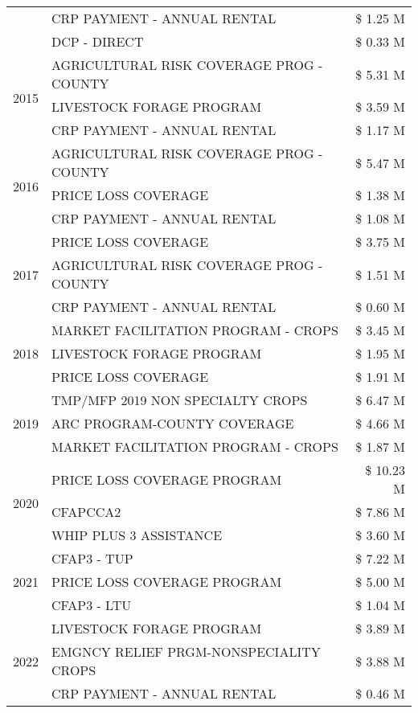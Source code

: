 \begin{tabular}{llr}
 & CRP PAYMENT - ANNUAL RENTAL & \$ 1.25 M \\
 & DCP - DIRECT & \$ 0.33 M \\
\cline{1-3}
\multirow[t]{3}{*}{2015} & AGRICULTURAL RISK COVERAGE PROG - COUNTY & \$ 5.31 M \\
 & LIVESTOCK FORAGE PROGRAM & \$ 3.59 M \\
 & CRP PAYMENT - ANNUAL RENTAL & \$ 1.17 M \\
\cline{1-3}
\multirow[t]{3}{*}{2016} & AGRICULTURAL RISK COVERAGE PROG - COUNTY & \$ 5.47 M \\
 & PRICE LOSS COVERAGE & \$ 1.38 M \\
 & CRP PAYMENT - ANNUAL RENTAL & \$ 1.08 M \\
\cline{1-3}
\multirow[t]{3}{*}{2017} & PRICE LOSS COVERAGE & \$ 3.75 M \\
 & AGRICULTURAL RISK COVERAGE PROG - COUNTY & \$ 1.51 M \\
 & CRP PAYMENT - ANNUAL RENTAL & \$ 0.60 M \\
\cline{1-3}
\multirow[t]{3}{*}{2018} & MARKET FACILITATION PROGRAM - CROPS & \$ 3.45 M \\
 & LIVESTOCK FORAGE PROGRAM & \$ 1.95 M \\
 & PRICE LOSS COVERAGE & \$ 1.91 M \\
\cline{1-3}
\multirow[t]{3}{*}{2019} & TMP/MFP 2019 NON SPECIALTY CROPS & \$ 6.47 M \\
 & ARC PROGRAM-COUNTY COVERAGE & \$ 4.66 M \\
 & MARKET FACILITATION PROGRAM - CROPS & \$ 1.87 M \\
\cline{1-3}
\multirow[t]{3}{*}{2020} & PRICE LOSS COVERAGE PROGRAM & \$ 10.23 M \\
 & CFAPCCA2 & \$ 7.86 M \\
 & WHIP PLUS 3 ASSISTANCE & \$ 3.60 M \\
\cline{1-3}
\multirow[t]{3}{*}{2021} & CFAP3 - TUP & \$ 7.22 M \\
 & PRICE LOSS COVERAGE PROGRAM & \$ 5.00 M \\
 & CFAP3 - LTU & \$ 1.04 M \\
\cline{1-3}
\multirow[t]{3}{*}{2022} & LIVESTOCK FORAGE PROGRAM & \$ 3.89 M \\
 & EMGNCY RELIEF PRGM-NONSPECIALITY CROPS & \$ 3.88 M \\
 & CRP PAYMENT - ANNUAL RENTAL & \$ 0.46 M \\
\cline{1-3}
\bottomrule
\end{tabular}
